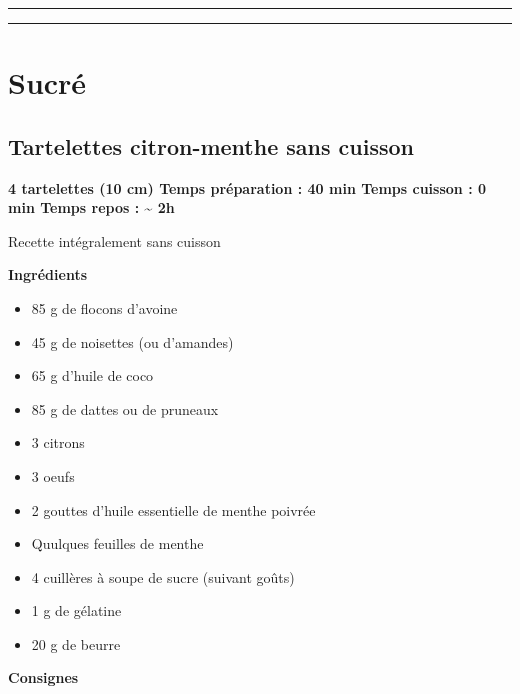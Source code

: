 \documentclass[]{book}
\providecommand{\tightlist}{%
  \setlength{\itemsep}{0pt}\setlength{\parskip}{0pt}}
\begin{document}
\begin{center}\rule{0.5\linewidth}{0.5pt}\end{center}

\begin{center}\rule{0.5\linewidth}{0.5pt}\end{center}

\section*{Sucré}\label{sucruxe9-1}

\subsection*{\texorpdfstring{{Tartelettes citron-menthe sans
cuisson}}{Tartelettes citron-menthe sans cuisson}}\label{tartelettes-citron-menthe-sans-cuisson}

\begin{sucrebox}
\textbf{4 tartelettes (10 cm) \textbar{} Temps préparation : 40 min
\textbar{} Temps cuisson : 0 min \textbar{} Temps repos :
\textasciitilde{} 2h}

Recette intégralement sans cuisson
\end{sucrebox}

 \textbf{Ingrédients}

\begin{itemize}
\tightlist
\item
  85 g de flocons d'avoine
\item
  45 g de noisettes (ou d'amandes)
\item
  65 g d'huile de coco
\item
  85 g de dattes ou de pruneaux
\item
  3 citrons
\item
  3 oeufs
\item
  2 gouttes d'huile essentielle de menthe poivrée
\item
  Quulques feuilles de menthe
\item
  4 cuillères à soupe de sucre (suivant goûts)
\item
  1 g de gélatine
\item
  20 g de beurre
\end{itemize}

\textbf{Consignes}
\end{document}
